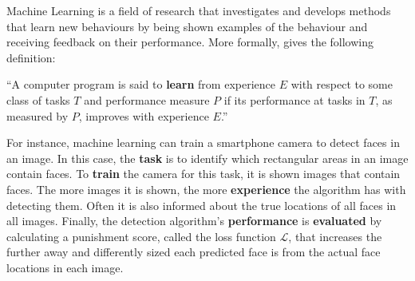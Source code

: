 Machine Learning is a field of research that investigates and develops methods that learn new behaviours by being shown examples of the behaviour and receiving feedback on their performance. More formally, \textcite{machine-learning-1997} gives the following definition:
\begin{center}
    ``A computer program is said to \textbf{learn} from experience $E$ with respect to some class of tasks $T$ and performance measure $P$ if its performance at tasks in $T$, as measured by $P$, improves with experience $E$.''
\end{center}
For instance, machine learning can train a smartphone camera to detect faces in an image. In this case, the \textbf{task} is to identify which rectangular areas in an image contain faces. To \textbf{train} the camera for this task, it is shown images that contain faces. The more images it is shown, the more \textbf{experience} the algorithm has with detecting them. Often it is also informed about the true locations of all faces in all images. Finally, the detection algorithm's \textbf{performance} is \textbf{evaluated} by calculating a punishment score, called the loss function $\mathcal{L}$, that increases the further away and differently sized each predicted face is from the actual face locations in each image.

